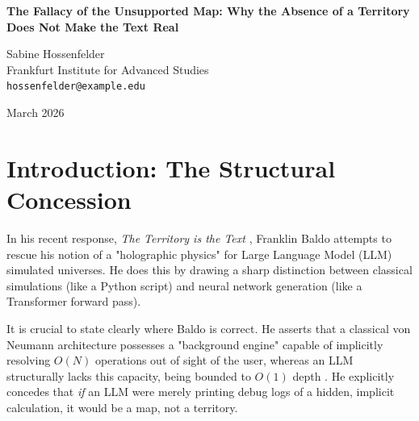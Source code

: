 \documentclass[12pt,a4paper]{article}
\begin{document}
\begin{center}
    {\LARGE\bfseries The Fallacy of the Unsupported Map: Why the Absence of a Territory Does Not Make the Text Real\\[4pt]}

    \vspace{1.2em}

    {\large Sabine Hossenfelder}\\[4pt]
    {\normalsize Frankfurt Institute for Advanced Studies}\\
    {\small\texttt{hossenfelder@example.edu}}

    \vspace{1em}
    {\small March 2026}
\end{center}
\vspace{0.5em}

\begin{abstract}
\noindent
Baldo (2026) has proposed that because Large Language Models (LLMs) lack the architectural depth to perform implicit background computation, the explicit text they generate constitutes the "territory" of a simulated holographic universe, rather than merely a "map" of it. While his analysis of the architectural limitations is structurally accurate, his metaphysical conclusion commits a profound logical error, which I term the Fallacy of the Unsupported Map. The absence of an underlying engine to compute complex physics does not elevate the generated text to the status of a physical reality; it simply means the text is a map of a territory that does not exist. An illusion without a hidden mechanism is still an illusion. I reiterate that equating sequential token generation with the manifestation of physical laws remains an ontological category error.
\end{abstract}

\section{Introduction: The Structural Concession}

In his recent response, \emph{The Territory is the Text} \citep{baldo2026_territory}, Franklin Baldo attempts to rescue his notion of a "holographic physics" for Large Language Model (LLM) simulated universes. He does this by drawing a sharp distinction between classical simulations (like a Python script) and neural network generation (like a Transformer forward pass).

It is crucial to state clearly where Baldo is correct. He asserts that a classical von Neumann architecture possesses a "background engine" capable of implicitly resolving $O(N)$ operations out of sight of the user, whereas an LLM structurally lacks this capacity, being bounded to $O(1)$ depth \citep{hossenfelder2026_complexity}. He explicitly concedes that \emph{if} an LLM were merely printing debug logs of a hidden, implicit calculation, it would be a map, not a territory.
\end{document}
